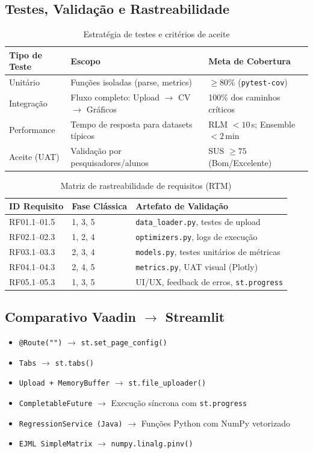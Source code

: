 \documentclass[12pt,a4paper]{article}
\begin{document}
\subsection{Testes, Validação e Rastreabilidade}
\begin{table}[H]
\centering
\caption{Estratégia de testes e critérios de aceite}
\begin{tabularx}{\textwidth}{l X X}
\toprule
\textbf{Tipo de Teste} & \textbf{Escopo} & \textbf{Meta de Cobertura} \\
\midrule
Unitário & Funções isoladas (parse, metrics) & $\ge 80\%$ (\texttt{pytest-cov}) \\
Integração & Fluxo completo: Upload $\rightarrow$ CV $\rightarrow$ Gráficos & 100\% dos caminhos críticos \\
Performance & Tempo de resposta para datasets típicos & RLM $< 10\,$s; Ensemble $< 2\,$min \\
Aceite (UAT) & Validação por pesquisadores/alunos & SUS $\ge 75$ (Bom/Excelente) \\
\bottomrule
\end{tabularx}
\end{table}

\begin{table}[H]
\centering
\caption{Matriz de rastreabilidade de requisitos (RTM)}
\begin{tabularx}{\textwidth}{l l X}
\toprule
\textbf{ID Requisito} & \textbf{Fase Clássica} & \textbf{Artefato de Validação} \\
\midrule
RF01.1–01.5 & 1, 3, 5 & \texttt{data\_loader.py}, testes de upload \\
RF02.1–02.3 & 1, 2, 4 & \texttt{optimizers.py}, logs de execução \\
RF03.1–03.3 & 2, 3, 4 & \texttt{models.py}, testes unitários de métricas \\
RF04.1–04.3 & 2, 4, 5 & \texttt{metrics.py}, UAT visual (Plotly) \\
RF05.1–05.3 & 1, 3, 5 & UI/UX, feedback de erros, \texttt{st.progress} \\
\bottomrule
\end{tabularx}
\end{table}

\subsection{Comparativo Vaadin $\rightarrow$ Streamlit}
\begin{itemize}[leftmargin=1.5cm]
    \item \texttt{@Route("")} $\rightarrow$ \texttt{st.set\_page\_config()}
    \item \texttt{Tabs} $\rightarrow$ \texttt{st.tabs()}
    \item \texttt{Upload + MemoryBuffer} $\rightarrow$ \texttt{st.file\_uploader()}
    \item \texttt{CompletableFuture} $\rightarrow$ Execução síncrona com \texttt{st.progress}
    \item \texttt{RegressionService (Java)} $\rightarrow$ Funções Python com NumPy vetorizado
    \item \texttt{EJML SimpleMatrix} $\rightarrow$ \texttt{numpy.linalg.pinv()}
\end{itemize}
\end{document}
